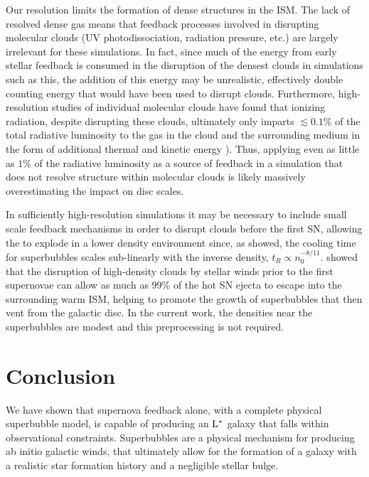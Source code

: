 Our resolution limits the formation of dense structures in the ISM.  The lack of
resolved dense gas means that feedback processes involved in disrupting
molecular clouds (UV photodissociation, radiation pressure, etc.) are largely
irrelevant for these simulations.  In fact, since much of the energy from early
stellar feedback is consumed in the disruption of the densest clouds in
simulations such as this, the addition of this energy may be unrealistic,
effectively double counting energy that would have been used to disrupt clouds.
Furthermore, high-resolution studies of individual molecular clouds have found
that ionizing radiation, despite disrupting these clouds, ultimately only
imparts $\lesssim 0.1\%$ of the total radiative luminosity to the gas in the
cloud and the surrounding medium in the form of additional thermal and kinetic
energy \citep{Dale2005, Gendelev2012, Walch2012}).  Thus, applying even as
little as $1\%$ of the radiative luminosity as a source of feedback in a
simulation that does not resolve structure within molecular clouds is likely
massively overestimating the impact on disc scales.

In sufficiently high-resolution simulations it may be necessary to include small
scale feedback mechanisms in order to disrupt clouds before the first SN,
allowing the to explode in a lower density environment since, as
\citet{MacLow1988} showed, the cooling time for superbubbles scales sub-linearly
with the inverse density, $t_R\propto n_0^{-8/11}$.  \citet{Rogers2013} showed
that the disruption of high-density clouds by stellar winds prior to the first
supernovae can allow as much as $99\%$ of the hot SN ejecta to escape into the
surrounding warm ISM, helping to promote the growth of superbubbles that then
vent from the galactic disc.  In the current work, the densities near the
superbubbles are modest and this preprocessing is not required.

\section{Conclusion}

We have shown that supernova feedback alone, with a complete physical
superbubble model, is capable of producing an $\rm{L^*}$ galaxy that falls
within observational constraints.  Superbubbles are a physical mechanism for
producing ab initio galactic winds, that ultimately allow for the formation of a
galaxy with a realistic star formation history and a negligible stellar bulge.

